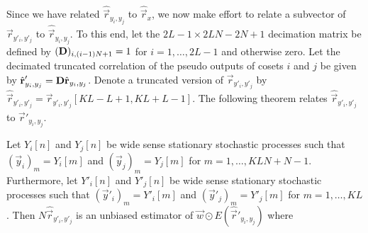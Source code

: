 \documentclass[a4paper, openany, oneside]{memoir}
\begin{document}
Since we have related $\hat{\vec{r}}_{y_i,y_j}$ to $\hat{\vec{r}}_x$, we now make effort to relate a subvector of $\vec{r}_{y'_i,y'_j}$ to $\hat{\vec{r}}_{y_i,y_j}$. To this end, let the $2L-1\times 2LN-2N+1$ decimation matrix be defined by $(\boldsymbol{\mathbf{D}})_{i,(i-1)N+1} = 1$ for $i=1,\ldots,2L-1$ and otherwise zero. Let the decimated truncated correlation of the pseudo outputs of cosets $i$ and $j$ be given by $\hat{\boldsymbol{\mathbf{r}}}'_{y_i,y_j} = \boldsymbol{\mathbf{D}} \hat{\boldsymbol{\mathbf{r}}}_{y_i,y_j}$. Denote a truncated version of $\vec{r}_{y'_i,y'_j}$ by $\hat{\vec{r}}_{y'_i,y'_j}=\vec{r}_{y'_i,y'_j}[KL-L+1,KL+L-1]$. The following theorem relates $\hat{\vec{r}}_{y'_i,y'_j}$ to $\hat{\vec{r}}'_{y_i,y_j}$.

\begin{blockTheorem} 
    Let $Y_i[n]$ and $Y_j[n]$ be wide sense stationary stochastic processes such that $(\vec{y}_i)_m = Y_i[m]$ and $(\vec{y}_j)_m = Y_j[m]$ for $m=1,\ldots,KLN+N-1$. Furthermore, let $Y'_i[n]$ and $Y'_j[n]$ be wide sense stationary stochastic processes such that $(\vec{y}'_i)_m = Y'_i[m]$ and $(\vec{y}'_j)_m = Y'_j[m]$ for $m=1,\ldots,KL$. Then $N\hat{\vec{r}}_{y'_i,y'_j}$ is an unbiased estimator of $\vec{w} \odot E(\hat{\vec{r}}'_{y_i,y_j})$ where

\end{blockTheorem}
\end{document}
